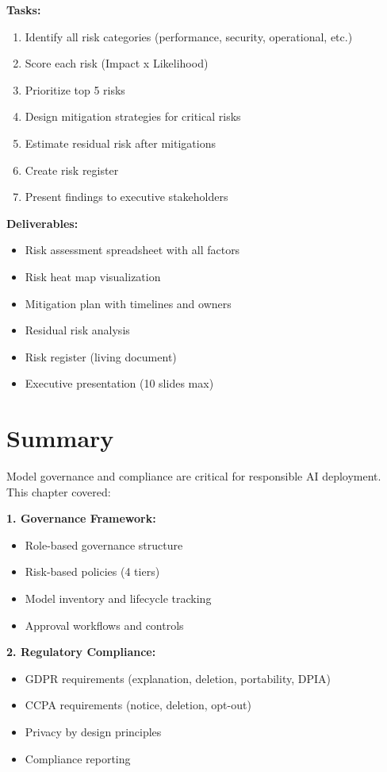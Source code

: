 \textbf{Tasks:}
\begin{enumerate}
    \item Identify all risk categories (performance, security, operational, etc.)
    \item Score each risk (Impact x Likelihood)
    \item Prioritize top 5 risks
    \item Design mitigation strategies for critical risks
    \item Estimate residual risk after mitigations
    \item Create risk register
    \item Present findings to executive stakeholders
\end{enumerate}

\textbf{Deliverables:}
\begin{itemize}
    \item Risk assessment spreadsheet with all factors
    \item Risk heat map visualization
    \item Mitigation plan with timelines and owners
    \item Residual risk analysis
    \item Risk register (living document)
    \item Executive presentation (10 slides max)
\end{itemize}

\section{Summary}

Model governance and compliance are critical for responsible AI deployment. This chapter covered:

\textbf{1. Governance Framework:}
\begin{itemize}
    \item Role-based governance structure
    \item Risk-based policies (4 tiers)
    \item Model inventory and lifecycle tracking
    \item Approval workflows and controls
\end{itemize}

\textbf{2. Regulatory Compliance:}
\begin{itemize}
    \item GDPR requirements (explanation, deletion, portability, DPIA)
    \item CCPA requirements (notice, deletion, opt-out)
    \item Privacy by design principles
    \item Compliance reporting
\end{itemize}

